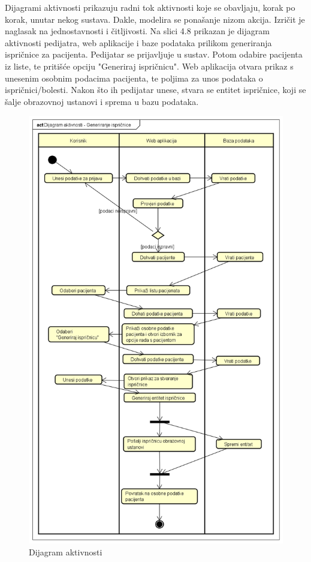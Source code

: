 			\text Dijagrami aktivnosti prikazuju radni tok aktivnosti koje se obavljaju, korak po korak, unutar nekog sustava. Dakle, modelira se ponašanje nizom akcija. Izričit je naglasak na jednostavnosti i čitljivosti. Na slici 4.8 prikazan je dijagram aktivnosti pedijatra, web aplikacije i baze podataka prilikom generiranja ispričnice za pacijenta. Pedijatar se prijavljuje u sustav. Potom odabire pacijenta iz liste, te pritišće opciju "Generiraj ispričnicu". Web aplikacija otvara prikaz s unesenim osobnim podacima pacijenta, te poljima za unos podataka o ispričnici/bolesti. Nakon što ih pedijatar unese, stvara se entitet ispričnice, koji se šalje obrazovnoj ustanovi i sprema u bazu podataka.
			
			\begin{figure}[H]
				\includegraphics[scale=0.5]{dijagrami/dijakt1.PNG} %
				\centering
				\caption{Dijagram aktivnosti}
				\label{fig:dijakt1}
			\end{figure}
			
